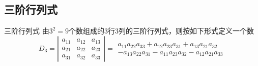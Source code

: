 \subsection{三阶行列式}

\begin{frame}

  
  \begin{overprint}
    \begin{block}{三阶行列式}
      由$3^2=9$个数组成的3行3列的三阶行列式，则按如下形式定义一个数
      $$ 
      D_3 = 
      \left|
      \begin{array}{ccc}
        a_{11} & a_{12} & a_{13} \\[0.2cm]
        a_{21} & a_{22} & a_{23} \\[0.2cm]
        a_{31} & a_{32} & a_{33} 
      \end{array}
      \right|
      = 
      \begin{array}{l}
          a_{11}a_{22}a_{33} + a_{12}a_{23}a_{31} + a_{13}a_{21}a_{32} \\[0.2cm]
        - a_{13}a_{22}a_{31} - a_{11}a_{23}a_{32} - a_{12}a_{21}a_{33}
      \end{array}
      $$

    \end{block}
  \end{overprint}
\end{frame}



